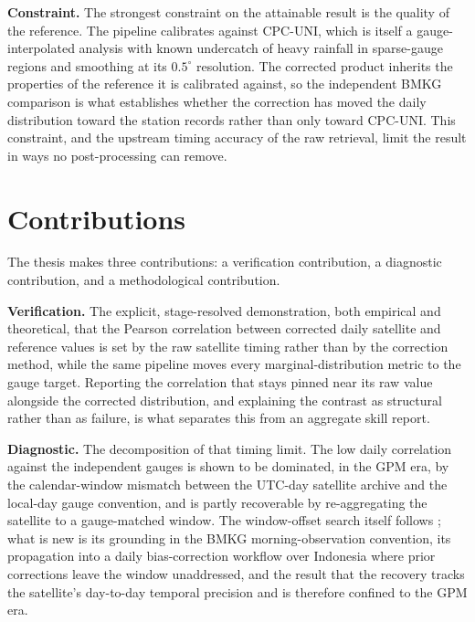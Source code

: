 \medskip\noindent\textbf{Constraint.}
The strongest constraint on the attainable result is the quality
of the reference. The pipeline calibrates against CPC-UNI, which
is itself a gauge-interpolated analysis with known undercatch of
heavy rainfall in sparse-gauge regions and smoothing at its
$0.5^{\circ}$ resolution. The corrected product inherits the
properties of the reference it is calibrated against, so the
independent BMKG comparison is what establishes whether the
correction has moved the daily distribution toward the station
records rather than only toward CPC-UNI. This constraint, and the
upstream timing accuracy of the raw retrieval, limit the result in
ways no post-processing can remove.


\section{Contributions}\label{sec:intro-novelty}

The thesis makes three contributions: a verification
contribution, a diagnostic contribution, and a methodological
contribution.

\medskip\noindent\textbf{Verification.}
The explicit, stage-resolved demonstration, both empirical and
theoretical, that the Pearson correlation between corrected daily
satellite and reference values is set by the raw satellite timing
rather than by the correction method, while the same pipeline moves
every marginal-distribution metric to the gauge target. Reporting
the correlation that stays pinned near its raw value alongside the
corrected distribution, and
explaining the contrast as structural rather than as failure, is
what separates this from an aggregate skill report.

\medskip\noindent\textbf{Diagnostic.}
The decomposition of that timing limit. The low daily correlation
against the independent gauges is shown to be dominated, in the GPM era, by the
calendar-window mismatch between the UTC-day satellite archive and
the local-day gauge convention, and is partly recoverable by
re-aggregating the satellite to a gauge-matched window. The
window-offset search itself follows \citet{ref:beck2019}; what is
new is its grounding in the BMKG morning-observation convention, its
propagation into a daily bias-correction workflow over Indonesia
where prior corrections leave the window unaddressed, and the result
that the recovery tracks the satellite's day-to-day temporal
precision and is therefore confined to the GPM era.

